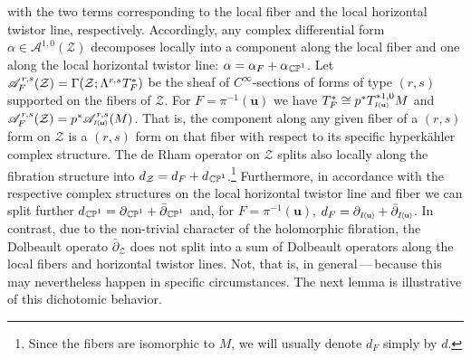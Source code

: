 \documentclass[11pt]{amsart}
\theoremstyle{remark}
\theoremstyle{remark}
\theoremstyle{definition}
\theoremstyle{definition}
\theoremstyle{definition}
\newcommand{\Iu}{\scriptscriptstyle{I\nhp(\nhp\mathbf{u}\hspace{-0.25pt})}} %
\newcommand{\0}{{\scriptstyle 0'}} %
\newcommand{\1}{{\scriptstyle 1'}}
\newcommand{\pt}{\hspace{1pt}} %
\newcommand{\hp}{\hspace{0.5pt}} %
\newcommand{\nhp}{\hspace{-0.5pt}} %
\begin{document}
with the two terms corresponding to the local fiber and the local horizontal twistor line, respectively. Accordingly, any complex differential form $\alpha \in \mathscr{A}^{1,0}(\mathcal{Z})$ decomposes locally into a component along the local fiber and one along the local horizontal twistor line: $\alpha = \alpha_F + \alpha_{\hp\smash{\mathbb{CP}^1}}$. Let \mbox{$\mathscr{A}^{\hp r,s}_F(\mathcal{Z}) = \Gamma(\mathcal{Z};\Lambda^{r,s\hp}T^*_F)$} be the sheaf of $C^{\infty}$-{\hp}sections of forms of type $(r,s)$ supported on the fibers of $\mathcal{Z}$. For \mbox{$F = \pi^{-1}(\mathbf{u})$} we have \mbox{$T^*_F \cong p^* T^{*\smash[t]{1,0}}_{\Iu} M$} and $\mathscr{A}^{\hp r,s}_F(\mathcal{Z}) = p^*\mathscr{A}^{\hp r,s}_{\Iu}(M)$. That is, the component along any given fiber of a $(r,s)$ form on $\mathcal{Z}$ is a $(r,s)$ form on that fiber with respect to its specific hyperk\"ahler complex structure. The de Rham operator on $\mathcal{Z}$ splits also locally along the fibration structure into \mbox{$d_{\mathcal{Z}} = d_F + d_{\hp\smash{\mathbb{CP}^1}}$.}\footnote{\pt Since the fibers are isomorphic to $M$, we will usually denote $d_F$ simply by $d$.} Furthermore, in accordance with the respective complex structures on the local horizontal twistor line and fiber we can split further $d_{\hp\smash{\mathbb{CP}^1}} = \partial_{\hp\smash{\mathbb{CP}^1}} + \bar{\partial}_{\hp\smash{\mathbb{CP}^1}}$ and, for $F = \pi^{-1}(\mathbf{u})$, $d_F = \partial_{\Iu} + \bar{\partial}_{\Iu}$. In contrast, due to the non-trivial character of the holomorphic fibration, the Dolbeault operato $\bar{\partial}_{\mathcal{Z}}$ does not split into a sum of Dolbeault operators along the local fibers and horizontal twistor lines. Not, that is, in general\,---\,because this may nevertheless happen in specific circumstances. The next lemma is illustrative of this dichotomic behavior.  
\end{document}
